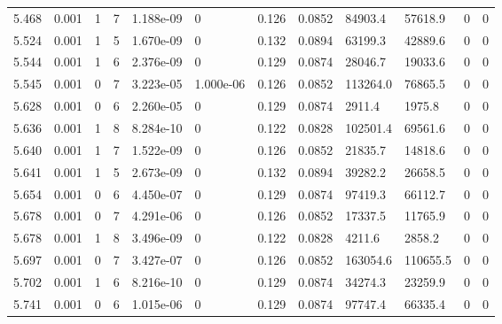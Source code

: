 \documentclass[preview]{standalone}
\begin{document}
{{{{{{\begin{tabular}{L{1.2cm}C{1.2cm} C{0.3cm}C{0.5cm} C{1.4cm}C{1.4cm} C{1.4cm}C{1.4cm} C{1.6cm}C{1.6cm} C{1.6cm}C{1.6cm}}
  5.468  &  0.001  & 1     &  7 &  1.188e-09  & 0  &  0.126&   0.0852& 84903.4 & 57618.9   &  0 & 0  \\ 
  5.524  &  0.001  & 1     &  5 &  1.670e-09  & 0  &  0.132&   0.0894& 63199.3 & 42889.6   &  0 & 0  \\ 
  5.544  &  0.001  & 1     &  6 &  2.376e-09  & 0  &  0.129&   0.0874& 28046.7 & 19033.6   &  0 & 0  \\ 
  5.545  &  0.001  & 0     &  7 &  3.223e-05  & 1.000e-06  &  0.126&   0.0852& 113264.0 & 76865.5   &  0 & 0  \\ 
  5.628  &  0.001  & 0     &  6 &  2.260e-05  & 0  &  0.129&   0.0874& 2911.4 & 1975.8   &  0 & 0  \\ 
  5.636  &  0.001  & 1     &  8 &  8.284e-10  & 0  &  0.122&   0.0828& 102501.4 & 69561.6   &  0 & 0  \\ 
  5.640  &  0.001  & 1     &  7 &  1.522e-09  & 0  &  0.126&   0.0852& 21835.7 & 14818.6   &  0 & 0  \\ 
  5.641  &  0.001  & 1     &  5 &  2.673e-09  & 0  &  0.132&   0.0894& 39282.2 & 26658.5   &  0 & 0  \\ 
  5.654  &  0.001  & 0     &  6 &  4.450e-07  & 0  &  0.129&   0.0874& 97419.3 & 66112.7   &  0 & 0  \\ 
  5.678  &  0.001  & 0     &  7 &  4.291e-06  & 0  &  0.126&   0.0852& 17337.5 & 11765.9   &  0 & 0  \\ 
  5.678  &  0.001  & 1     &  8 &  3.496e-09  & 0  &  0.122&   0.0828& 4211.6 & 2858.2   &  0 & 0  \\ 
  5.697  &  0.001  & 0     &  7 &  3.427e-07  & 0  &  0.126&   0.0852& 163054.6 & 110655.5   &  0 & 0  \\ 
  5.702  &  0.001  & 1     &  6 &  8.216e-10  & 0  &  0.129&   0.0874& 34274.3 & 23259.9   &  0 & 0  \\ 
  5.741  &  0.001  & 0     &  6 &  1.015e-06  & 0  &  0.129&   0.0874& 97747.4 & 66335.4   &  0 & 0  \\ 
\hline 
\end{tabular} 

}}}}}}
\end{document}
